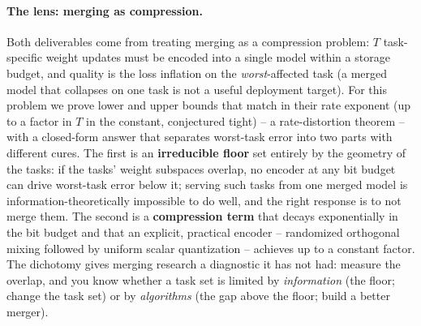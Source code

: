 \paragraph{The lens: merging as compression.} Both deliverables come
from treating merging as a
compression problem: $T$ task-specific weight updates must be encoded
into a single model within a storage budget, and quality is the loss
inflation on the \emph{worst}-affected task (a merged model that
collapses on one task is not a useful deployment target). For this
problem we prove lower and upper bounds that match in their rate
exponent (up to a factor in $T$ in the constant, conjectured tight)
-- a rate-distortion theorem -- with a closed-form answer that
separates worst-task error
into two parts with different cures. The first is an
\textbf{irreducible floor} set entirely by the geometry of the tasks:
if the tasks' weight subspaces overlap, no encoder at any bit budget
can drive worst-task error below it; serving such tasks from one
merged model is information-theoretically impossible to do well, and
the right response is to not merge them. The second is a
\textbf{compression term} that decays exponentially in the bit budget
and that an explicit, practical encoder -- randomized orthogonal
mixing followed by uniform scalar quantization -- achieves up to a
constant factor. The dichotomy gives merging research a diagnostic it
has not had: measure the overlap, and you know whether a task set is
limited by \emph{information} (the floor; change the task set) or by
\emph{algorithms} (the gap above the floor; build a better merger).


